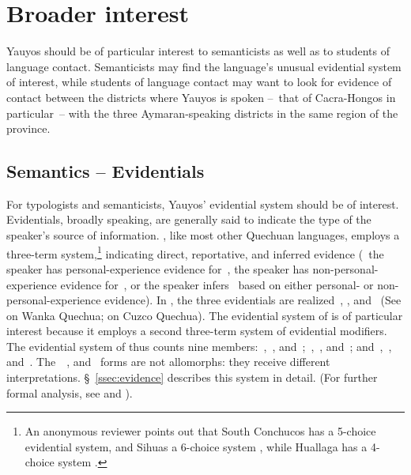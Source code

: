 \section{Broader interest}\label{sec:brin}
Yauyos should be of particular interest to semanticists as well as to students of language contact. Semanticists may find the language’s unusual evidential system of interest, while students of language contact may want to look for evidence of contact between the districts where Yauyos is spoken --~that of Cacra-Hongos in particular~-- with the three Aymaran-speaking districts in the same region of the province.

\subsection{Semantics -- Evidentials}
For typologists and semanticists, Yauyos’ evidential system should be of interest. Evidentials, broadly speaking, are generally said to indicate the type of the speaker’s source of information. \SYQ, like most other Quechuan languages, employs a three-term system,\footnote{An anonymous reviewer points out that South Conchucos has a 5-choice evidential system, and Sihuas a 6-choice system \citep{Hintz14}, while Huallaga has a 4-choice system \citep{Weber89}.} indicating direct, reportative, and inferred evidence (\ie~the speaker has personal-experience evidence for~, the speaker has non-personal-experience evidence for~, or the speaker infers~ based on either personal- or non-personal-experience evidence). In \SYQ, the three evidentials are realized~, , and~ (See \citet{Floyd99} on Wanka Quechua; \citet{Faller03} on Cuzco Quechua). The evidential system of \SYQ{} is of particular interest because it employs a second three-term system of evidential modifiers. The evidential system of \SYQ{} thus counts nine members:~,~, and~;~,~, and~; and~,~, and~. The~~, and~ forms are not allomorphs: they receive different interpretations. §~\ref{ssec:evidence} describes this system in detail. (For further formal analysis, see \citealt{Shimelman12} and \citealt{Shimelman14}).

